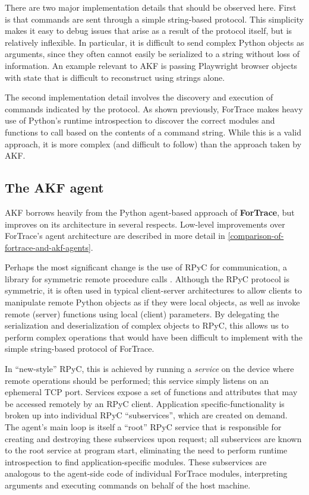 \documentclass[letterpaper,12pt]{report}
\begin{document}
There are two major implementation details that should be observed here.
First is that commands are sent through a simple string-based protocol.
This simplicity makes it easy to debug issues that arise as a result of
the protocol itself, but is relatively inflexible. In particular, it is
difficult to send complex Python objects as arguments, since they often
cannot easily be serialized to a string without loss of information. An
example relevant to AKF is passing Playwright browser objects with state
that is difficult to reconstruct using strings alone.

The second implementation detail involves the discovery and execution of
commands indicated by the protocol. As shown previously, ForTrace makes
heavy use of Python's runtime introspection to discover the correct
modules and functions to call based on the contents of a command string.
While this is a valid approach, it is more complex (and difficult to
follow) than the approach taken by AKF.

\subsection{The AKF agent}\label{the-akf-agent}

AKF borrows heavily from the Python agent-based approach of
\textbf{ForTrace}, but improves on its architecture in several respects.
Low-level improvements over ForTrace's agent architecture are described
in more detail in \autoref{comparison-of-fortrace-and-akf-agents}.

Perhaps the most significant change is the use of RPyC for
communication, a library for symmetric remote procedure calls
\cite{TomerfilibaorgRpyc2025}. Although the RPyC protocol is
symmetric, it is often used in typical client-server architectures to
allow clients to manipulate remote Python objects as if they were local
objects, as well as invoke remote (server) functions using local
(client) parameters. By delegating the serialization and deserialization
of complex objects to RPyC, this allows us to perform complex operations
that would have been difficult to implement with the simple string-based
protocol of ForTrace.

In ``new-style'' RPyC, this is achieved by running a \emph{service} on
the device where remote operations should be performed; this service
simply listens on an ephemeral TCP port. Services expose a set of
functions and attributes that may be accessed remotely by an RPyC
client. Application specific-functionality is broken up into individual
RPyC ``subservices'', which are created on demand. The agent's main loop
is itself a ``root'' RPyC service that is responsible for creating and
destroying these subservices upon request; all subservices are known to
the root service at program start, eliminating the need to perform
runtime introspection to find application-specific modules. These
subservices are analogous to the agent-side code of individual ForTrace
modules, interpreting arguments and executing commands on behalf of the
host machine.
\end{document}

